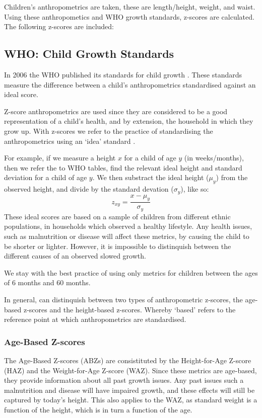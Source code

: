 \begin{refsection}
Children's anthropometrics are taken, these are length/height, weight, and waist.
Using these anthropometics and WHO growth standards, z-scores are calculated.
The following z-scores are included:


\subsection{WHO: Child Growth Standards}
\label{sa:data:who}
In 2006 the WHO published its standards for child growth \parencite{who2006child}.
These standards measure the difference between a child's anthropometrics
standardised against an ideal score.

Z-score anthropometrics are used since they are considered to be a good representation of a child's health,
and by extension, the household in which they grow up.
With z-scores we refer to the practice of standardising the anthropometrics using an `idea' standard \parencite{who2006child}.

For example, if we measure a height $x$ for a child of age $y$ (in weeks/months),
then we refer the to WHO tables, find the relevant ideal height and standard deviation for a child of age $y$.
We then substract the ideal height ($\mu_y$) from the observed height,
and divide by the standard devation ($\sigma_y$), like so:
\[
z_{xy} = \frac{x - \mu_y}{\sigma_{y}}
\]
These ideal scores are based on a sample of children from different ethnic populations,
in households which observed a healthy lifestyle.
Any health issues, such as malnutrition or disease will affect these metrics,
by causing the child to be shorter or lighter.
However, it is impossible to distinquish between the different causes of an observed slowed growth.

We stay with the best practice of using only metrics for children between the ages of 6 months and 60 months.

In general, can distinquish between two types of anthropometric z-scores, the age-based z-scores and the height-based z-scores.
Whereby `based' refers to the reference point at which anthropometrics are standardised.

\subsubsection{Age-Based Z-scores}
The Age-Based Z-scores (ABZs) are consistituted by the Height-for-Age Z-score (HAZ) and the Weight-for-Age Z-score (WAZ).
Since these metrics are age-based, they provide information about all past growth issues.
Any past issues such a malnutrition and disease will have impaired growth,
and these effects will still be captured by today's height.
This also applies to the WAZ, as standard weight is a function of the height,
which is in turn a function of the age.


\end{refsection}
